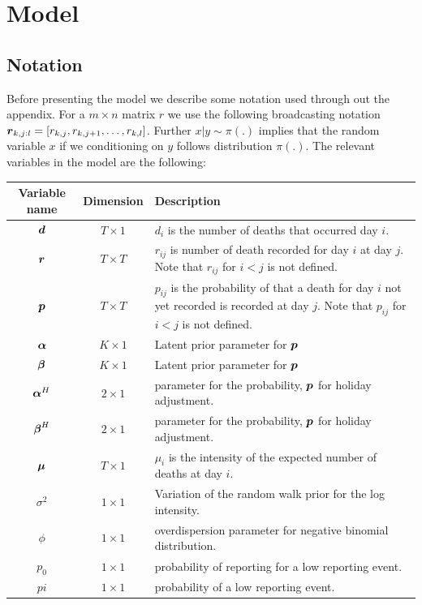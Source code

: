 \section{Model}
\subsection{Notation}
Before presenting the model we describe some notation used through out the appendix. For a $m \times n$ matrix $r$ we use the following broadcasting notation ${\boldsymbol{r}}_{k,j:l}=[ r_{k,j}, r_{k,j+1}, \ldots, r_{k,l}]$.
Further $x | y \sim \pi(.)$ implies that the random variable $x$ if we conditioning on $y$ follows distribution $\pi(.)$.
The relevant variables in the model are the following:

	\begin{tabularx}{\linewidth}{ccL}
		Variable name & Dimension & Description \\  \hline
		${\boldsymbol{d}}$ & $T \times 1$ & $d_i$ is the number of deaths that occurred day $i$. \\
		${\boldsymbol{r}}$ & $T \times T$ & $r_{ij}$ is number of death recorded for day $i$ at day $j$.  Note that $r_{ij}$ for $i<j$ is not defined.   \\
		${\boldsymbol{p}}$ & $T \times T$ & $p_{ij}$ is the probability of that a death for day $i$ not yet recorded is recorded at day $j$.
		  Note that $p_{ij}$ for $i<j$ is not defined.  \\
		${\boldsymbol{\alpha}}$ & $K \times 1$ & Latent prior parameter for ${\boldsymbol{p}}$ \\
		${\boldsymbol{\beta}}$ & $K \times 1$ & Latent prior parameter for ${\boldsymbol{p}}$ \\
		${\boldsymbol{\alpha}}^H$ & $2 \times 1$ & parameter for the probability, ${\boldsymbol{p}}$ for holiday adjustment. \\
		${\boldsymbol{\beta}}^H$ & $2 \times 1$ & parameter for the probability, ${\boldsymbol{p}}$ for holiday adjustment. \\
		${\boldsymbol{\mu}}$ &  $T \times 1$ &  $\mu_i$  is the intensity of the expected number of deaths at day $i$. \\
		$\sigma^2$ & $1\times 1$ & Variation of the random walk prior for the log intensity. \\
		$\phi$ & $1\times 1$ & overdispersion parameter for negative binomial distribution. \\
		$p_0$ & $1\times 1$ & probability of reporting for a low reporting event. \\
		$pi$ & $1\times 1$ & probability of a low reporting event.
	\end{tabularx}
